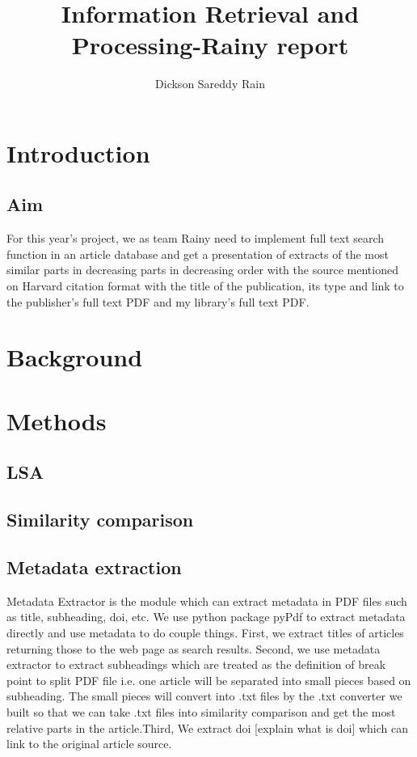\documentclass[a4paper,twocolumn,twoside]{article}
\begin{document}
 
	
	\title{Information Retrieval and Processing-Rainy report}
	\author{Dickson Sareddy Rain}  %
	\maketitle   
	
	\section{Introduction}
	\label{Introduction}
	\subsection{Aim}
	\label{aim}
	For this year's project, we as team Rainy need to implement full text search function in an article 
	database and get a presentation of extracts of the most similar parts in decreasing parts in decreasing 
	order with the source mentioned on Harvard citation format with the title of the publication, its type and 
	link to the publisher's full text PDF and my library's full text PDF. 		

	\section{Background}
	\label{Background}
	
	\section{Methods}
	\label{Methods}
	\subsection{LSA}
	\subsection{Similarity comparison}
	\subsection{Metadata extraction}
    Metadata Extractor is the module which can extract metadata in PDF files such as title, subheading, doi, etc. We use python package pyPdf to extract metadata directly and use metadata to do couple things. First, we extract titles of articles returning those to the web page as search results. Second, we use metadata extractor to extract subheadings which are treated as the definition of break point to split PDF file i.e. one article will be separated into small pieces based on subheading. The small pieces will convert into .txt files by the .txt converter we built so that we can take .txt files into similarity comparison and get the most relative parts in the article.Third, We extract doi [explain what is doi] which can link to the original article source. 
	
\end{document}
